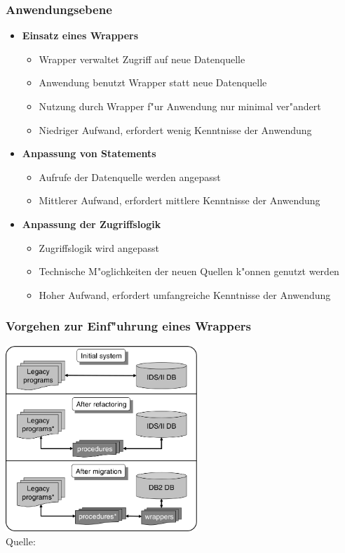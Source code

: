 \documentclass{beamer}
\begin{document}
	\begin{frame}
		\frametitle{Anwendungsebene}
		
		\begin{itemize}
			\item \textbf{Einsatz eines Wrappers} 
				\begin{itemize}
					\item Wrapper verwaltet Zugriff auf neue Datenquelle
					\item Anwendung benutzt Wrapper statt neue Datenquelle
					\item Nutzung durch Wrapper f"ur Anwendung nur minimal ver"andert
					\item Niedriger Aufwand, erfordert wenig Kenntnisse der Anwendung
				\end{itemize}
			\item \textbf{Anpassung von Statements} 
				\begin{itemize}
					\item Aufrufe der Datenquelle werden angepasst
					\item Mittlerer Aufwand, erfordert mittlere Kenntnisse der Anwendung
				\end{itemize}
			\item \textbf{Anpassung der Zugriffslogik}
				\begin{itemize}
					\item Zugriffslogik wird angepasst
					\item Technische M"oglichkeiten der neuen Quellen k"onnen genutzt werden
					\item Hoher Aufwand, erfordert umfangreiche Kenntnisse der Anwendung
				\end{itemize}
		\end{itemize}
	\end{frame}
	
	\begin{frame}
		\frametitle{Vorgehen zur Einf"uhrung eines Wrappers}
		
		\centering
		\includegraphics[height = 7cm]{../images/large_scale_fig_01.png} \\
		\tiny Quelle: \cite{henrard-2008}
	\end{frame}
	
\end{document}

